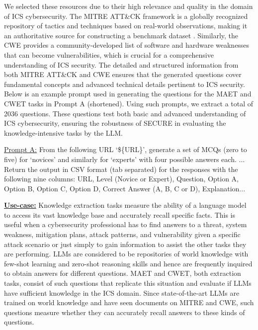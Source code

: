 \documentclass[conference]{IEEEtran}
\begin{document}
We selected these resources due to their high relevance and quality in the domain of ICS cybersecurity. The MITRE ATT\&CK framework is a globally recognized repository of tactics and techniques based on real-world observations, making it an authoritative source for constructing a benchmark dataset \cite{mitreOrg}. Similarly, the CWE provides a community-developed list of software and hardware weaknesses that can become vulnerabilities, which is crucial for a comprehensive understanding of ICS security. The detailed and structured information from both MITRE ATT\&CK and CWE ensures that the generated questions cover fundamental concepts and advanced technical details pertinent to ICS security. Below is an example prompt used in generating the questions for the MAET and CWET tasks in Prompt A (shortened). Using such prompts, we extract a total of 2036 questions. These questions test both basic and advanced understanding of ICS cybersecurity, ensuring the robustness of SECURE in evaluating the knowledge-intensive tasks by the LLM.

\begin{highlighted}{}
\footnotesize
\underline{Prompt A:} From the following URL `\$\{URL\}', generate a set of MCQs (zero to five) for `novices' and similarly for `experts' with four possible answers each. ...  Return the output in CSV format (tab separated) for the responses with the following nine columns: URL, Level (Novice or Expert), Question, Option A, Option B, Option C, Option D, Correct Answer (A, B, C or D), Explanation...
\end{highlighted}


\underline{\textbf{Use-case:}} Knowledge extraction tasks measure the ability of a language model to access its vast knowledge base and accurately recall specific facts. This is useful when a cybersecurity professional has to find answers to a threat, system weakness, mitigation plans, attack patterns, and vulnerability given a specific attack scenario or just simply to gain information to assist the other tasks they are performing. LLMs are considered to be repositories of world knowledge with few-shot learning \cite{brown2020language} and zero-shot reasoning \cite{kojima2022large} skills and hence are frequently inquired to obtain answers for different questions. MAET and CWET, both extraction tasks, consist of such questions that replicate this situation and evaluate if LLMs have sufficient knowledge in the ICS domain. Since state-of-the-art LLMs are trained on world knowledge and have seen documents on MITRE and CWE, such questions measure whether they can accurately recall answers to these kinds of questions.
\end{document}
